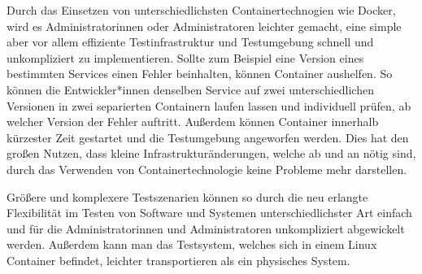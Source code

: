
Durch das Einsetzen von unterschiedlichsten Containertechnogien wie Docker, wird es Administratorinnen oder Administratoren leichter gemacht, eine simple aber vor allem effiziente Testinfrastruktur und Testumgebung schnell und unkompliziert zu implementieren. Sollte zum Beispiel eine Version eines bestimmten Services einen Fehler beinhalten, können Container aushelfen. So können die Entwickler*innen denselben Service auf zwei unterschiedlichen Versionen in zwei separierten Containern laufen lassen und individuell prüfen, ab welcher Version der Fehler auftritt. Außerdem können Container innerhalb kürzester Zeit gestartet und die Testumgebung angeworfen werden. Dies hat den großen Nutzen, dass kleine Infrastrukturänderungen, welche ab und an nötig sind, durch das Verwenden von Containertechnologie keine Probleme mehr darstellen. \cite{TestenContainer}

Größere und komplexere Testszenarien können so durch die neu erlangte Flexibilität im Testen von Software und Systemen unterschiedlichster Art einfach und für die Administratorinnen und Administratoren unkompliziert abgewickelt werden. Außerdem kann man das Testsystem, welches sich in einem Linux Container befindet, leichter transportieren als ein physisches System. \cite{TestenContainer}

